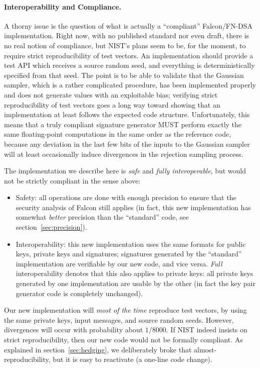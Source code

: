 \documentclass{llncs}
\begin{document}
\paragraph{Interoperability and Compliance.}
A thorny issue is the question of what is actually a ``compliant''
Falcon/FN-DSA implementation. Right now, with no published standard nor
even draft, there is no real notion of compliance, but NIST's plans seem
to be, for the moment, to require strict reproducibility of test
vectors. An implementation should provide a test API which receives a
source random seed, and everything is deterministically specified from
that seed. The point is to be able to validate that the Gaussian
sampler, which is a rather complicated procedure, has been implemented
properly and does not generate values with an exploitable bias;
verifying strict reproducibility of test vectors goes a long way toward
showing that an implementation at least follows the expected code
structure. Unfortunately, this means that a truly compliant signature
generator MUST perform exactly the same floating-point computations in
the same order as the reference code, because any deviation in the last
few bits of the inputs to the Gaussian sampler will at least
occasionally induce divergences in the rejection sampling process.

The implementation we describe here is \emph{safe} and \emph{fully
interoperable}, but would not be strictly compliant in the sense above:
\begin{itemize}

    \item Safety: all operations are done with enough precision to ensure
    that the security analysis of Falcon still applies (in fact, this
    new implementation has somewhat \emph{better} precision than the
    ``standard'' code, see section~\ref{sec:precision}).

    \item Interoperability: this new implementation uses the same
    formats for public keys, private keys and signatures; signatures
    generated by the ``standard'' implementation are verifiable by our
    new code, and vice versa. \emph{Full} interoperability denotes that
    this also applies to private keys: all private keys generated by one
    implementation are usable by the other (in fact the key pair
    generator code is completely unchanged).

\end{itemize}
Our new implementation will \emph{most of the time} reproduce test vectors,
by using the same private keys, input messages, and source random seeds.
However, divergences will occur with probability about $1/8000$. If NIST
indeed insists on strict reproducibility, then our new code would not be
formally compliant. As explained in section~\ref{sec:hedging}, we
deliberately broke that almost-reproducibility, but it is easy to
reactivate (a one-line code change).
\end{document}
